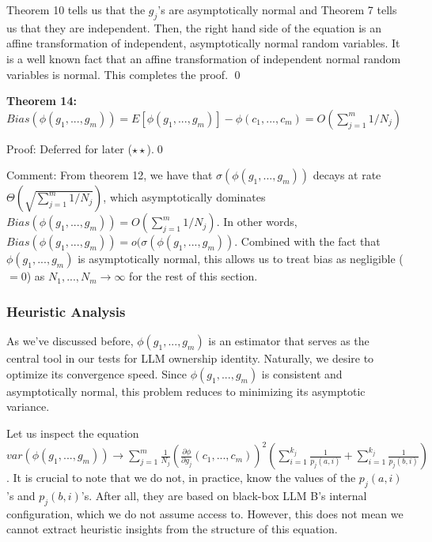 \documentclass{article}
\begin{document}
Theorem 10 tells us that the $\displaystyle g_{j}$'s are asymptotically normal and Theorem 7 tells us that they are independent. Then, the right hand side of the equation is an affine transformation of independent, asymptotically normal random variables. It is a well known fact that an affine transformation of independent normal random variables is normal. This completes the proof. \qed 



\textbf{Theorem 14: }$\displaystyle Bias\left( \phi \left( g_{1} ,...,g_{m}\right)\right) =E\left[ \phi \left( g_{1} ,...,g_{m}\right)\right] -\phi \left( c_{1} ,...,c_{m}\right) =O\left(\sum _{j=1}^{m} 1/N_{j}\right)$

Proof: Deferred for later ($\displaystyle \star \star $).\qed 



Comment: From theorem 12, we have that $\sigma( \phi ( g_{1} ,...,g_{m}))$ decays at rate $\Theta (\sqrt{\sum _{j=1}^{m} 1/N_{j}})$, which asymptotically dominates $Bias( \phi ( g_{1} ,...,g_{m})) =O(\sum _{j=1}^{m} 1/N_{j})$. In other words, $Bias( \phi ( g_{1} ,...,g_{m})) =o( \sigma ( \phi ( g_{1} ,...,g_{m}))$. Combined with the fact that $\displaystyle \phi ( g_{1} ,...,g_{m})$ is asymptotically normal, this allows us to treat bias as negligible ($\displaystyle =0$) as $\displaystyle N_{1} ,...,N_{m}\rightarrow \infty $ for the rest of this section.



\subsubsection*{Heuristic Analysis}

As we've discussed before, $\displaystyle \phi \left( g_{1} ,...,g_{m}\right)$ is an estimator that serves as the central tool in our tests for LLM ownership identity. Naturally, we desire to optimize its convergence speed. Since $\displaystyle \phi \left( g_{1} ,...,g_{m}\right)$ is consistent and asymptotically normal, this problem reduces to minimizing its asymptotic variance.



Let us inspect the equation $\displaystyle var\left( \phi \left( g_{1} ,...,g_{m}\right)\right)\rightarrow \sum _{j=1}^{m}\frac{1}{N_{j}}\left(\frac{\partial \phi }{\partial g_{j}}\left( c_{1} ,...,c_{m}\right)\right)^{2}\left(\sum _{i=1}^{k_{j}}\frac{1}{p_{j}\left( a,i\right)} +\sum _{i=1}^{k_{j}}\frac{1}{p_{j}\left( b,i\right)}\right)$. It is crucial to note that we do not, in practice, know the values of the $\displaystyle p_{j}\left( a,i\right)$'s and $\displaystyle p_{j}\left( b,i\right)$'s. After all, they are based on black-box LLM B's internal configuration, which we do not assume access to. However, this does not mean we cannot extract heuristic insights from the structure of this equation.
\end{document}
